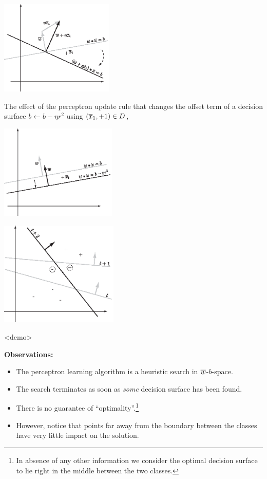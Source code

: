 \documentclass[a4paper,blends,pdf,colorBG,slideColor]{prosper}
\begin{document}
\vspace{.2in}
\begin{center}
\includegraphics[height=45mm]{figures/fig05-02.eps}
\end{center}

\es

The effect of the perceptron update rule that changes the offset term 
of a decision surface $b \leftarrow b - \eta  r^2$ using
$(\overline{x}_1,+1)\in D$,

\vspace{.2in}
\begin{center}
\includegraphics[height=45mm]{figures/fig05-03.eps}
\end{center}

\es

\begin{center}
\includegraphics[height=50mm]{figures/fig05-04.eps}
\end{center}
{\tiny <demo>}
\es

{\bf Observations:} 
\begin{itemize}
\item The perceptron learning algorithm is a heuristic search in $\overline{w}$-$b$-space.
\item The search terminates as soon as {\em some} decision surface has been found.
\item There is no guarantee of ``optimality''.\footnote{In absence of any other information we consider
the optimal decision surface to lie right in the middle between the two classes.}
\item However, notice that points far away from the boundary between the classes have very little impact
on the solution.
\end{itemize}
\end{document}
